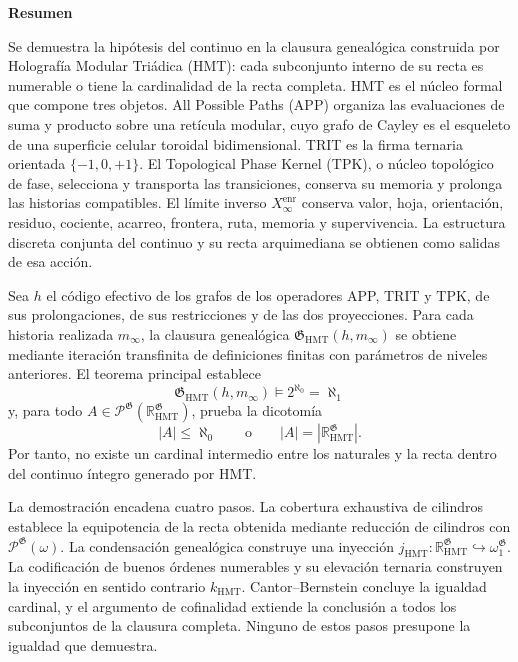 \begingroup
\begin{center}\textbf{Resumen}\end{center}
\fontsize{9.1}{10.55}\selectfont
\setlength{\parskip}{1.2pt}
\setlength{\abovedisplayskip}{3pt}
\setlength{\belowdisplayskip}{3pt}
Se demuestra la hipótesis del continuo en la clausura genealógica construida
por Holografía Modular Triádica (HMT): cada subconjunto interno de su recta es
numerable o tiene la cardinalidad de la recta completa. HMT es el núcleo formal
que compone tres objetos. All Possible Paths (APP) organiza las evaluaciones
de suma y producto sobre una retícula modular, cuyo grafo de Cayley es el
esqueleto de una superficie celular toroidal bidimensional. TRIT es la firma
ternaria orientada \(\{-1,0,+1\}\). El Topological Phase Kernel (TPK), o núcleo
topológico de fase, selecciona y transporta las transiciones, conserva su
memoria y prolonga las historias compatibles. El límite inverso
\(X_\infty^{\mathrm{enr}}\) conserva valor, hoja, orientación, residuo,
cociente, acarreo, frontera, ruta, memoria y supervivencia. La estructura
discreta conjunta del continuo y su recta arquimediana se obtienen como salidas
de esa acción.

Sea \(h\) el código efectivo de los grafos de los operadores APP, TRIT y TPK,
de sus prolongaciones, de sus restricciones y de las dos proyecciones. Para
cada historia realizada \(m_\infty\), la clausura genealógica
\(\mathfrak G_{\mathrm{HMT}}(h,m_\infty)\) se obtiene mediante iteración
transfinita de definiciones finitas con parámetros de niveles anteriores. El
teorema principal establece
\[
 \boxed{\mathfrak G_{\mathrm{HMT}}(h,m_\infty)
 \models 2^{\aleph_0}=\aleph_1}
\]
y, para todo
\(A\in\mathcal P^{\mathfrak G}
(\mathbb R_{\mathrm{HMT}}^{\mathfrak G})\), prueba la dicotomía
\[
 |A|\leq\aleph_0
 \qquad\text{o}\qquad
 |A|=|\mathbb R_{\mathrm{HMT}}^{\mathfrak G}|.
\]
Por tanto, no existe un cardinal intermedio entre los naturales y la recta
dentro del continuo íntegro generado por HMT.

La demostración encadena cuatro pasos. La cobertura exhaustiva de cilindros
establece la equipotencia de la recta obtenida mediante reducción de cilindros con
\(\mathcal P^{\mathfrak G}(\omega)\). La condensación genealógica construye
una inyección
\(j_{\mathrm{HMT}}:\mathbb R_{\mathrm{HMT}}^{\mathfrak G}
\hookrightarrow\omega_1^{\mathfrak G}\). La codificación de buenos órdenes
numerables y su elevación ternaria construyen la inyección en sentido contrario
\(k_{\mathrm{HMT}}\). Cantor--Bernstein concluye la igualdad cardinal, y el
argumento de cofinalidad extiende la conclusión a todos los subconjuntos de la
clausura completa. Ninguno de estos pasos presupone la igualdad que demuestra.

